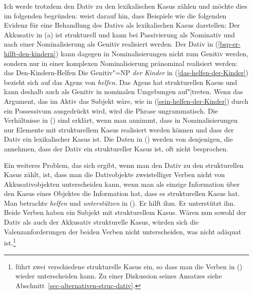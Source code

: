 Ich werde trotzdem den Dativ zu den lexikalischen Kasus zählen und möchte dies im folgenden
begründen: \citet[]{Haider86} weist darauf hin, dass Beispiele wie die folgenden Evidenz
für eine Behandlung des Dativs als lexikalischen Kasus darstellen:
\eal
{}
\label{das-helfen-der-Kinder}
\label{sein-helfen-der-Kinder}
\zl
Der Akkusativ in (a) ist strukturell und kann bei Passivierung als Nominativ
und nach einer Nominalisierung als Genitiv realisiert werden.
Der Dativ in (\ref{bsp-er-hilft-den-kindern}) kann dagegen in Nominalisierungen nicht zum Genitiv werden,
sondern nur in einer komplexen Nominalisierung pränominal realisiert werden:
\ea
das Den-Kindern-Helfen
\z
Die Genitiv"=NP \emph{der Kinder} in (\ref{das-helfen-der-Kinder}) bezieht sich auf das Agens
von \emph{helfen}. Das Agens hat strukturellen Kasus und kann deshalb auch als Genitiv in
nominalen Umgebungen auf"|treten. Wenn das Argument, das im Aktiv das Subjekt wäre, wie in (\ref{sein-helfen-der-Kinder})
durch ein Possessivum ausgedrückt wird, wird die Phrase ungrammatisch. Die Verhältnisse in
() sind erklärt, wenn man annimmt, dass in Nominalisierungen nur Elemente mit strukturellem
Kasus realisiert werden können und dass der Dativ ein lexikalischer Kasus ist.
Die Daten in () werden von denjenigen, die annehmen, dass der Dativ ein struktureller Kasus ist, oft
nicht besprochen.

Ein weiteres Problem, das sich ergibt, wenn man den Dativ zu den strukturellen Kasus
zählt, ist, dass man die Dativobjekte zweistelliger Verben
nicht von Akkusativobjekten
unterscheiden kann, wenn man als einzige Information über den Kasus eines Objektes
die Information hat, dass es strukturellen Kasus hat. Man betrachte \zb \emph{helfen} und
\emph{unterstützen} in ().
\eal
\ex Er hilft ihm.
\ex Er unterstützt ihn.
\zl
Beide Verben haben ein Subjekt mit strukturellem Kasus. Wären nun sowohl der Dativ als auch der
Akkusativ strukturelle Kasus, würden sich die Valenzanforderungen der beiden Verben nicht
unterscheiden, was nicht adäquat ist.\footnote{
  \citet{Gunkel2003b} führt zwei verschiedene strukturelle Kasus ein, so dass man die Verben in
  () wieder unterscheiden kann. Zu einer Diskussion seines Ansatzes siehe
  Abschnitt~\ref{sec-alternativen-struc-dativ}.%
}

